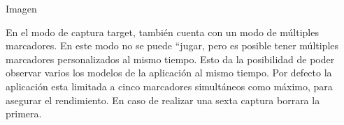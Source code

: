 Imagen


En el modo de captura target, también cuenta con un modo de múltiples marcadores. En este modo no se puede ``jugar, pero es posible tener múltiples marcadores personalizados al mismo tiempo. Esto da la posibilidad de poder observar varios los modelos de la aplicación al mismo tiempo. Por defecto la aplicación esta limitada a cinco marcadores simultáneos como máximo, para asegurar el rendimiento. En caso de realizar una sexta captura borrara la primera.




 


